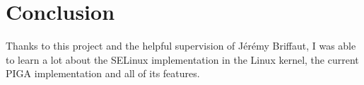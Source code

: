 \documentclass[pdftex,a4paper,titlepage,11pt]{article}
\begin{document}
\newpage

\section*{Conclusion} 

Thanks to this project and the helpful supervision of Jérémy Briffaut, I was
able to learn a lot about the SELinux implementation in the Linux kernel, the
current PIGA implementation and all of its features.


\newpage


{}


\nocite{*}
\end{document}
